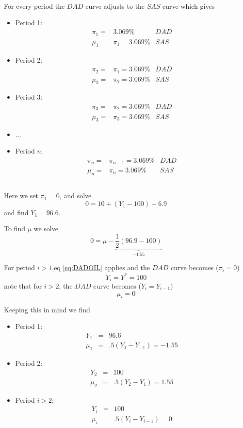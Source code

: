 \documentclass[a4paper] {scrartcl}
\begin{document}
For every period the $DAD$ curve adjusts to the $SAS$ curve which gives
\begin{itemize}
	\item Period 1:
	\begin{eqnarray}
		\pi_1 =& 3.069\%&DAD\\
		\mu_1 =& \pi_1=3.069\%&SAS
	\end{eqnarray}
	\item Period 2:
	\begin{eqnarray}
		\pi_2 =& \pi_1=3.069\%&DAD\\
		\mu_2 =& \pi_2=3.069\%&SAS
	\end{eqnarray}
	\item Period 3:
	\begin{eqnarray}
		\pi_3 =& \pi_2= 3.069\%&DAD\\
		\mu_3 =& \pi_3=3.069\%&SAS
	\end{eqnarray}
	\item ...
	\item Period $n$:
	\begin{eqnarray}
		\pi_n =& \pi_{n-1}= 3.069\%&DAD\\
		\mu_n =& \pi_n=3.069\%&SAS
	\end{eqnarray}
\end{itemize}

\subsection{ }
Here we set $\pi_1=0$, 
and solve
\begin{equation}
	0 = 10 + (Y_1-100)-6.9
\end{equation}
and find $Y_1=96.6$.

To find $\mu$ we solve
\begin{equation}
	0 = \mu -\underbrace{\frac{1}{2}(96.9-100)}_{-1.55}
\end{equation}

For period $i>1$,eq \ref{eq:DADOIL} applies and the $DAD$ curve becomes ($\pi_i=0$)
\begin{equation}
	Y_i=Y^*=100
\end{equation} 
note that for $i>2$, the $DAD$ curve becomes ($Y_i = Y_{i-1}$)
\begin{equation}
	\mu_i=0
\end{equation}

Keeping this in mind we find
\begin{itemize}
	\item Period 1:
	\begin{eqnarray}
		Y_1&=&96.6\\
		\mu_1 &=& .5(Y_1-Y_{-1}) = -1.55
	\end{eqnarray}
	\item Period 2:
	\begin{eqnarray}
		Y_2&=&100\\
		\mu_2 &=& .5(Y_2-Y_{1}) = 1.55
	\end{eqnarray}
	\item Period $i>2$:
	\begin{eqnarray}
		Y_i&=&100\\
		\mu_i &=& .5(Y_i-Y_{i-1}) =0
	\end{eqnarray}
\end{itemize}
\end{document}

